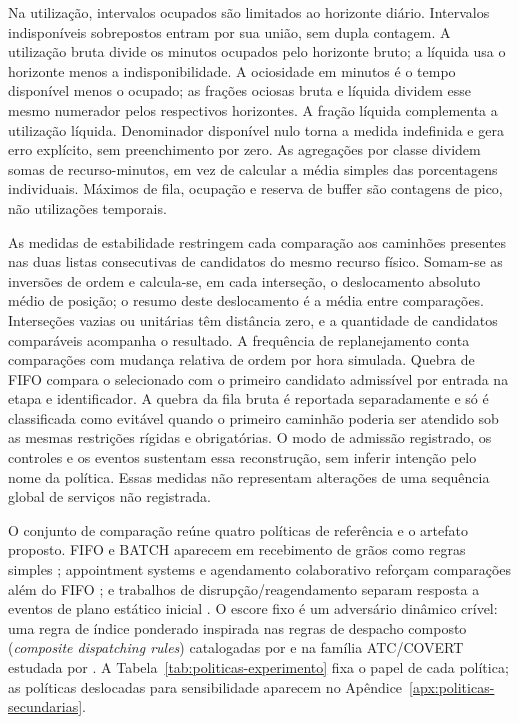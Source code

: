 \documentclass[
  12pt,
  oneside,
  a4paper,
  sumario=tradicional,
  brazil
]{abntex2}
\begin{document}
Na utiliza\c{c}\~ao, intervalos ocupados s\~ao limitados ao horizonte di\'ario. Intervalos indispon\'iveis sobrepostos entram por sua uni\~ao, sem dupla contagem. A utiliza\c{c}\~ao bruta divide os minutos ocupados pelo horizonte bruto; a l\'iquida usa o horizonte menos a indisponibilidade. A ociosidade em minutos \'e o tempo dispon\'ivel menos o ocupado; as fra\c{c}\~oes ociosas bruta e l\'iquida dividem esse mesmo numerador pelos respectivos horizontes. A fra\c{c}\~ao l\'iquida complementa a utiliza\c{c}\~ao l\'iquida. Denominador dispon\'ivel nulo torna a medida indefinida e gera erro expl\'icito, sem preenchimento por zero. As agrega\c{c}\~oes por classe dividem somas de recurso-minutos, em vez de calcular a m\'edia simples das porcentagens individuais. M\'aximos de fila, ocupa\c{c}\~ao e reserva de buffer s\~ao contagens de pico, n\~ao utiliza\c{c}\~oes temporais.

As medidas de estabilidade restringem cada compara\c{c}\~ao aos caminh\~oes presentes nas duas listas consecutivas de candidatos do mesmo recurso f\'isico. Somam-se as invers\~oes de ordem e calcula-se, em cada interse\c{c}\~ao, o deslocamento absoluto m\'edio de posi\c{c}\~ao; o resumo deste deslocamento \'e a m\'edia entre compara\c{c}\~oes. Interse\c{c}\~oes vazias ou unit\'arias t\^em dist\^ancia zero, e a quantidade de candidatos compar\'aveis acompanha o resultado. A frequ\^encia de replanejamento conta compara\c{c}\~oes com mudan\c{c}a relativa de ordem por hora simulada. Quebra de FIFO compara o selecionado com o primeiro candidato admiss\'ivel por entrada na etapa e identificador. A quebra da fila bruta \'e reportada separadamente e s\'o \'e classificada como evit\'avel quando o primeiro caminh\~ao poderia ser atendido sob as mesmas restri\c{c}\~oes r\'igidas e obrigat\'orias. O modo de admiss\~ao registrado, os controles e os eventos sustentam essa reconstru\c{c}\~ao, sem inferir inten\c{c}\~ao pelo nome da pol\'itica. Essas medidas n\~ao representam altera\c{c}\~oes de uma sequ\^encia global de servi\c{c}os n\~ao registrada.

O conjunto de compara\c{c}\~ao re\'une quatro pol\'iticas de refer\^encia e o artefato proposto. FIFO e BATCH aparecem em recebimento de gr\~aos como regras simples \parencite{r.berrutoAnalyzingReceivingOperation2001a}; appointment systems e agendamento colaborativo refor\c{c}am compara\c{c}\~oes al\'em do FIFO \parencite{phanCollaborativeTruckScheduling2016a, azabDynamicCollaborativeTruck2017a}; e trabalhos de disrup\c{c}\~ao/reagendamento separam resposta a eventos de plano est\'atico inicial \parencite{liDisruptionManagementTruck2018a, xuDynamicAppointmentRescheduling2022}. O escore fixo \'e um advers\'ario din\^amico cr\'ivel: uma regra de \'indice ponderado inspirada nas regras de despacho composto (\textit{composite dispatching rules}) catalogadas por \textcite{panwalkarSurveySchedulingRules1977} e na fam\'ilia ATC/COVERT estudada por \textcite{vepsalainenPriorityRulesJob1987}. A Tabela~\ref{tab:politicas-experimento} fixa o papel de cada pol\'itica; as pol\'iticas deslocadas para sensibilidade aparecem no Ap\^endice~\ref{apx:politicas-secundarias}.
\end{document}
